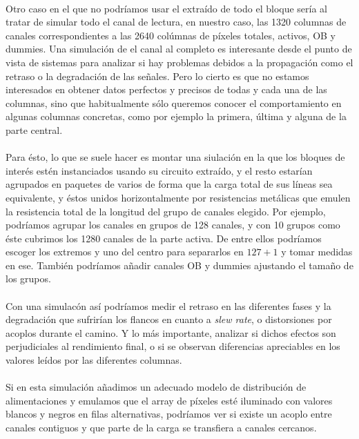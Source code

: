 \paragraph{}
Otro caso en el que no podríamos usar el extraído de todo el bloque sería al tratar
de simular todo el canal de lectura, en nuestro caso, las 1320 columnas de canales
correspondientes a las 2640 colúmnas de píxeles totales, activos, OB y dummies.
Una simulación de el canal al completo es interesante desde el punto de vista de
sistemas para analizar si hay problemas debidos a la propagación como el retraso
o la degradación de las señales. Pero lo cierto es que no estamos interesados
en obtener datos perfectos y precisos de todas y cada una de las columnas, sino que
habitualmente sólo queremos conocer el comportamiento en algunas columnas concretas,
como por ejemplo la primera, última y alguna de la parte central.

\paragraph{}
Para ésto, lo que se suele hacer es montar una siulación en la que los bloques
de interés estén instanciados usando su circuito extraído, y el resto estarían
agrupados en paquetes de varios de forma que la carga total de sus líneas sea
equivalente, y éstos unidos horizontalmente por resistencias metálicas que
emulen la resistencia total de la longitud del grupo de canales elegido. Por
ejemplo, podríamos agrupar los canales en grupos de 128 canales, y con 10 grupos
como éste cubrimos los 1280 canales de la parte activa. De entre ellos podríamos
escoger los extremos y uno del centro para separarlos en $127 + 1$ y tomar medidas
en ese. También podríamos añadir canales OB y dummies ajustando el tamaño de los
grupos.

\paragraph{}
Con una simulacón así podríamos medir el retraso en las diferentes fases y la
degradación que sufrirían los flancos en cuanto a \textit{slew rate}, o distorsiones
por acoplos durante el camino. Y lo más importante, analizar si dichos efectos
son perjudiciales al rendimiento final, o si se observan diferencias apreciables
en los valores leídos por las diferentes columnas.

\paragraph{}
Si en esta simulación añadimos un adecuado modelo de distribución de alimentaciones
y emulamos que el array de píxeles esté iluminado con valores blancos y negros en
filas alternativas, podríamos ver si existe un acoplo entre canales contiguos y
que parte de la carga se transfiera a canales cercanos.

